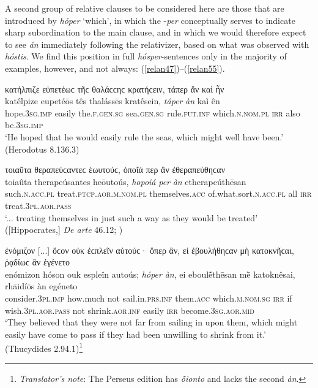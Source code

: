A second group of relative clauses to be considered here are those that are introduced by \emph{hóper} `which', in which the -\emph{per} conceptually serves to indicate sharp subordination to the main clause, and in which we would therefore expect to see \emph{án} immediately following the relativizer, based on what was observed with \emph{hóstis}. We find this position in full \emph{hósper}-sentences only in the majority of examples, however, and not always: (\ref{relan47})--(\ref{relan55}).

\begin{exe}
\ex κατήλπιζε εὐπετέωϲ τῆϲ θαλάϲϲηϲ κρατήϲειν, τάπερ ἂν καὶ ἦν\\
\gll katḗlpize eupetéōs tês thalássēs kratḗsein, \emph{táper} \emph{àn} kaì ên\\
hope.\textsc{3sg.imp} easily the.\textsc{f.gen.sg} sea.\textsc{gen.sg}
rule.\textsc{fut.inf} which.\textsc{n.nom.pl} \textsc{irr} also be.\textsc{3sg.imp}\\
\trans `He hoped that he would easily rule the seas, which might well have been.' (Herodotus 8.136.3)
\label{relan47}
\end{exe}

\begin{exe}
\ex τοιαῦτα θεραπεύϲαντεϲ ἑωυτούϲ, ὁποῖά περ ἂν ἐθεραπεύθηϲαν\\
\gll toiaûta therapeúsantes heōutoús, \emph{hopoîá} \emph{per} \emph{àn} etherapeúthēsan\\
such.\textsc{n.acc.pl} treat.\textsc{ptcp.aor.m.nom.pl} themselves.\textsc{acc} of.what.sort.\textsc{n.acc.pl} all \textsc{irr} treat.\textsc{3pl.aor.pass}\\
\trans `... treating themselves in just such a way as they would be treated' ({[}Hippocrates,{]} \textit{De arte} 46.12; \citealp[46, line 12]{Gomperz1890})
\label{relan48}
\end{exe}

\begin{exe}
\ex ἐνόμιζον {[}...{]} ὅϲον οὐκ ἐϲπλεῖν αὐτούϲ· ὅπερ ἂν, εἰ ἐβουλήθηϲαν μὴ κατοκνῆϲαι, ῥᾳδίωϲ ἂν ἐγένετο\\
\gll enómizon hóson ouk espleîn autoús; \emph{hóper} \emph{àn}, ei eboulḗthēsan mḕ katoknêsai, rhāidíōs àn egéneto\\
consider.\textsc{3pl.imp} how.much not sail.in.\textsc{prs.inf} them.\textsc{acc} which.\textsc{m.nom.sg} \textsc{irr} if wish.\textsc{3pl.aor.pass} not shrink.\textsc{aor.inf} easily \textsc{irr} become.\textsc{3sg.aor.mid}\\
\trans `They believed that they were not far from sailing in upon them, which might easily have come to pass if they had been unwilling to shrink from it.' (Thucydides 2.94.1)\footnote{\emph{Translator's note}: The Perseus edition has \textit{ṓionto} and lacks the
second \textit{àn}.}
\label{relan49}
\end{exe}

